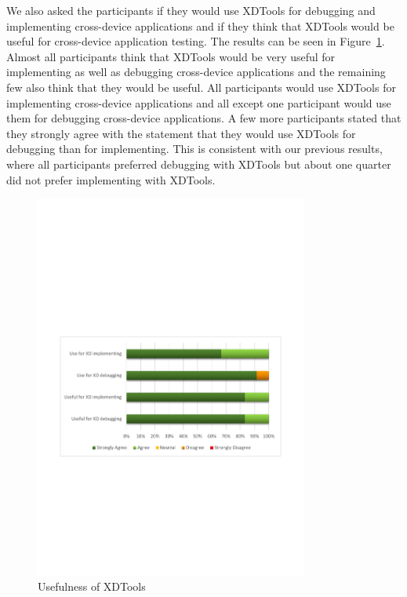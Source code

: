 We also asked the participants if they would use XDTools for debugging and implementing cross-device applications and if they think that XDTools would be useful for cross-device application testing. The results can be seen in Figure~\ref{fig:usefulness_tool}. Almost all participants think that XDTools would be very useful for implementing as well as debugging cross-device applications and the remaining few also think that they would be useful. All participants would use XDTools for implementing cross-device applications and all except one participant would use them for debugging cross-device applications. A few more participants stated that they strongly agree with the statement that they would use XDTools for debugging than for implementing. This is consistent with our previous results, where all participants preferred debugging with XDTools but about one quarter did not prefer implementing with XDTools.

\begin{figure}[H]
  \centering
    \includegraphics[width=0.8\textwidth]{images/charts/usefulness_tool.pdf}
	\caption[Usefulness]{Usefulness of XDTools}
	\label{fig:usefulness_tool}
\end{figure}

